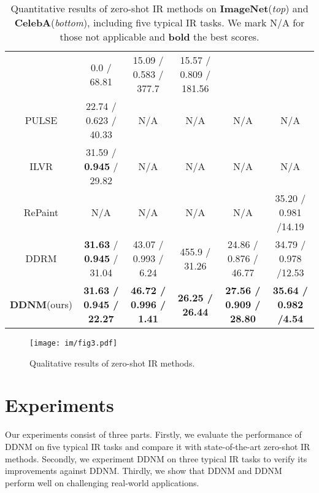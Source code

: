 \documentclass{article} \usepackage{iclr2023_conference,times}
\begin{document}
\begin{table*}[t]
\begin{tabular}{cccccc}
            &0.0 / 68.81&15.09 / 0.583 / 377.7& 15.57 / 0.809 / 181.56\\
            \rule{0pt}{10pt}{PULSE} &22.74 / 0.623 / 40.33&{N/A}& {N/A}& {N/A}& {N/A}\\
            \rule{0pt}{10pt}{ILVR} &31.59 / \textbf{0.945} / 29.82 &{N/A}& {N/A}& {N/A}& {N/A}\\
            \rule{0pt}{10pt}{RePaint} &{N/A}&{N/A}& {N/A}& {N/A}&35.20 / 0.981 /14.19\\
            \rule{0pt}{10pt}{DDRM} &\textbf{31.63} / \textbf{0.945} / 31.04&43.07 / 0.993 / 6.24
            &455.9 / 31.26&24.86 / 0.876 / 46.77&34.79 / 0.978 /12.53\\
            \rule{0pt}{10pt}{\textbf{DDNM}(ours)} &\textbf{31.63 / 0.945 / 22.27}&\textbf{46.72 / 0.996 / 1.41}   &\textbf{26.25 / 26.44}&\textbf{27.56 / 0.909 / 28.80}&\textbf{35.64 / 0.982 /4.54}\\
        \hline
    \end{tabular}
    \caption{Quantitative results of zero-shot IR methods on \textbf{ImageNet}(\textit{top}) and \textbf{CelebA}(\textit{bottom}), including five typical IR tasks. We mark N/A for those not applicable and \textbf{bold} the best scores.}
    \label{tb:ndm}
\end{table*}

\begin{figure*}[t]
  \centering
\texttt{[image: im/fig3.pdf]}
  \vspace{-0.4cm}
  \caption{Qualitative results of zero-shot IR methods. }
  \vspace{-0.1cm}
\label{fig:ndm+ comprehensive} 
\end{figure*}


\section{Experiments}
Our experiments consist of three parts. Firstly, we evaluate the performance of DDNM on five typical IR tasks and compare it with state-of-the-art zero-shot IR methods. Secondly, we experiment DDNM on three typical IR tasks to verify its improvements against DDNM. Thirdly, we show that DDNM and DDNM perform well on challenging real-world applications.
\end{document}
